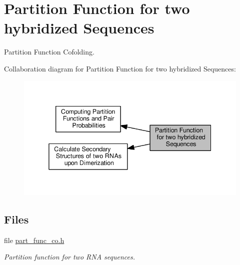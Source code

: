 \hypertarget{group__pf__cofold}{}\section{Partition Function for two hybridized Sequences}
\label{group__pf__cofold}


Partition Function Cofolding.  


Collaboration diagram for Partition Function for two hybridized Sequences\+:
\nopagebreak
\begin{figure}[H]
\begin{center}
\leavevmode
\includegraphics[width=338pt]{group__pf__cofold}
\end{center}
\end{figure}
\subsection*{Files}
\begin{DoxyCompactItemize}
\item 
file \hyperlink{part__func__co_8h}{part\+\_\+func\+\_\+co.\+h}
\begin{DoxyCompactList}\small\item\em Partition function for two R\+NA sequences. \end{DoxyCompactList}\end{DoxyCompactItemize}
